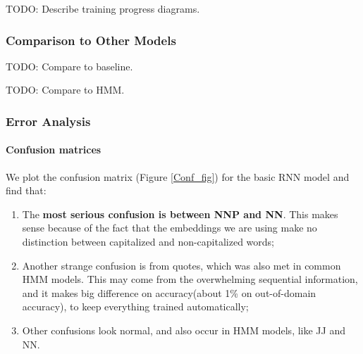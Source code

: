 \documentclass[11pt]{article}
\begin{document}
TODO: Describe training progress diagrams.

\subsubsection{Comparison to Other Models}

TODO: Compare to baseline.

TODO: Compare to HMM.

\subsubsection{Error Analysis}

\paragraph{Confusion matrices} 
We plot the confusion matrix (Figure \ref{Conf_fig}) for the basic RNN model and find that:
\begin{enumerate}
\item The \textbf{most serious confusion is between NNP and NN}. This makes sense because of the fact that the embeddings we are using make no distinction between capitalized and non-capitalized words;
\item  Another strange confusion is from quotes, which was also met in common HMM models. This may come from the overwhelming sequential information, and it makes big difference on accuracy(about 1\% on out-of-domain accuracy), to keep everything trained automatically;
\item Other confusions look normal, and also occur in HMM models, like JJ and NN.
\end{enumerate}
\end{document}
